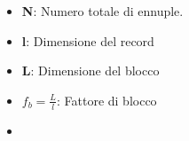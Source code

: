 \begin{itemize}
    \item \textbf{N}: Numero totale di ennuple.
    \item \textbf{l}: Dimensione del record
    \item \textbf{L}: Dimensione del blocco
    \item \textbf{$f_b = \frac Ll$}: Fattore di blocco
    \item 
\end{itemize}